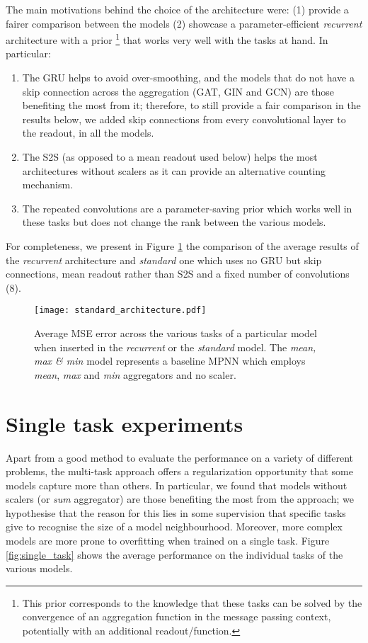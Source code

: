 \documentclass{article}
\begin{document}
The main motivations behind the choice of the architecture were: (1) provide a fairer comparison between the models (2) showcase a parameter-efficient \textit{recurrent} architecture with a prior \footnote{This prior corresponds to the knowledge that these tasks can be solved by the convergence of an aggregation function in the message passing context, potentially with an additional readout/function.} that works very well with the tasks at hand. In particular:
\begin{enumerate}
    \item The GRU helps to avoid over-smoothing, and the models that do not have a skip connection across the aggregation (GAT, GIN and GCN) are those benefiting the most from it; therefore, to still provide a fair comparison in the results below, we added  skip connections from every convolutional layer to the readout, in all the models. 
    \item The S2S (as opposed to a mean readout used below) helps the most architectures without scalers as it can provide an alternative counting mechanism. 
    \item The repeated convolutions are a parameter-saving prior which works well in these tasks but does not change the rank between the various models.
\end{enumerate}

For completeness, we present in Figure \ref{fig:standard_architecture} the comparison of the average results of the \textit{recurrent} architecture and \textit{standard} one which uses no GRU but skip connections, mean readout rather than S2S and a fixed number of convolutions (8).

\begin{figure}[h]
\centering
\texttt{[image: standard\_architecture.pdf]}
\caption{Average MSE error across the various tasks of a particular model when inserted in the \textit{recurrent}  or the \textit{standard} model. The \textit{mean, max \& min} model represents a baseline MPNN which employs \textit{mean}, \textit{max} and \textit{min} aggregators and no scaler.}
\label{fig:standard_architecture}
\end{figure}


\section{Single task experiments} \label{app:single_task}

Apart from a good method to evaluate the performance on a variety of different problems, the multi-task approach offers a regularization opportunity that some models capture more than others. In particular, we found that models without scalers (or \textit{sum} aggregator) are those benefiting the most from the approach; we hypothesise that the reason for this lies in some supervision that specific tasks give to recognise the size of a model neighbourhood. Moreover, more complex models are more prone to overfitting when trained on a single task. Figure \ref{fig:single_task} shows the average performance on the individual tasks of the various models.
\end{document}
